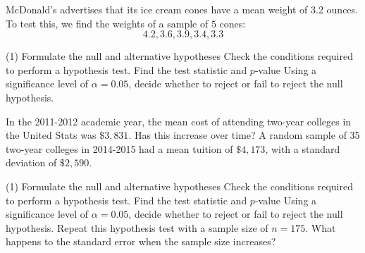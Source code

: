 \documentclass[../mathNotesPreamble]{subfiles}
\begin{document}
  \begin{ex*}
    McDonald's advertises that its ice cream cones have a mean weight of 3.2 ounces. To test this, we find the weights of a sample of $5$ cones:
      \[4.2, 3.6, 3.9, 3.4, 3.3\]
  \end{ex*}
  \begin{extasks}[after-item-skip=\stretch{1}](1)
    \task Formulate the null and alternative hypotheses
    \task Check the conditions required to perform a hypothesis test.
    \task Find the test statistic and $p$-value
    \task Using a significance level of $\alpha=0.05$, decide whether to reject or fail to reject the null hypothesis.
  \end{extasks}
  \pagebreak

  \begin{ex*}
    In the 2011-2012 academic year, the mean cost of attending two-year colleges in the United Stats was $\$3,831$. Has this increase over time? A random sample of 35 two-year colleges in 2014-2015 had a mean tuition of $\$4,173$, with a standard deviation of $\$2,590$.
  \end{ex*}
  \begin{extasks}[after-item-skip=\stretch{1}](1)
    \task Formulate the null and alternative hypotheses
    \task Check the conditions required to perform a hypothesis test.
    \task Find the test statistic and $p$-value
    \task Using a significance level of $\alpha=0.05$, decide whether to reject or fail to reject the null hypothesis.
    \task Repeat this hypothesis test with a sample size of $n=175$. What happens to the standard error when the sample size increases?
  \end{extasks}

  \pagebreak
\end{document}

